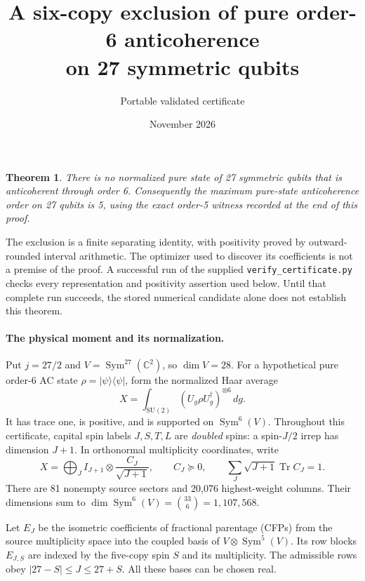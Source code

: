 \documentclass[11pt]{article}
\newtheorem{theorem}{Theorem}
\newcommand{\Tr}{\operatorname{Tr}}
\newcommand{\Sym}{\operatorname{Sym}}
\begin{document}
\title{A six-copy exclusion of pure order-6 anticoherence\protect\\on 27 symmetric qubits}
\author{Portable validated certificate}\date{November 2026}\maketitle

\begin{theorem}
There is no normalized pure state of 27 symmetric qubits that is
anticoherent through order 6. Consequently the maximum pure-state
anticoherence order on 27 qubits is 5, using the exact order-5 witness
recorded at the end of this proof.
\end{theorem}

The exclusion is a finite separating identity, with positivity proved by
outward-rounded interval arithmetic. The optimizer used to discover its
coefficients is not a premise of the proof. A successful run of the
supplied \texttt{verify\_certificate.py} checks every representation and
positivity assertion used below. Until that complete run succeeds, the
stored numerical candidate alone does not establish this theorem.

\paragraph{The physical moment and its normalization.}
Put $j=27/2$ and $V=\Sym^{27}(\mathbb C^2)$, so $\dim V=28$.
For a hypothetical pure order-6 AC state $\rho=|\psi\rangle\langle\psi|$,
form the normalized Haar average
\[
 X=\int_{\mathrm{SU}(2)}(U_g\rho U_g^\dagger)^{\otimes6}\,dg.
\]
It has trace one, is positive, and is supported on $\Sym^6(V)$.
Throughout this certificate, capital spin labels $J,S,T,L$ are
\emph{doubled} spins: a spin-$J/2$ irrep has dimension $J+1$.
In orthonormal multiplicity coordinates, write
\[
 X=\bigoplus_J I_{J+1}\otimes\frac{C_J}{\sqrt{J+1}},
 \qquad C_J\succeq0,
 \qquad\sum_J\sqrt{J+1}\Tr C_J=1.                 \tag{1}
\]
There are 81 nonempty source sectors and 20,076 highest-weight columns.
Their dimensions sum to
$\dim\Sym^6(V)=\binom{33}{6}=1,107,568$.

Let $E_J$ be the isometric coefficients of fractional parentage (CFPs)
from the source multiplicity space into the coupled basis of
$V\otimes\Sym^5(V)$. Its row blocks $E_{J,S}$ are indexed by the
five-copy spin $S$ and its multiplicity. The admissible rows obey
$|27-S|\le J\le27+S$. All these bases can be chosen real.
\end{document}
